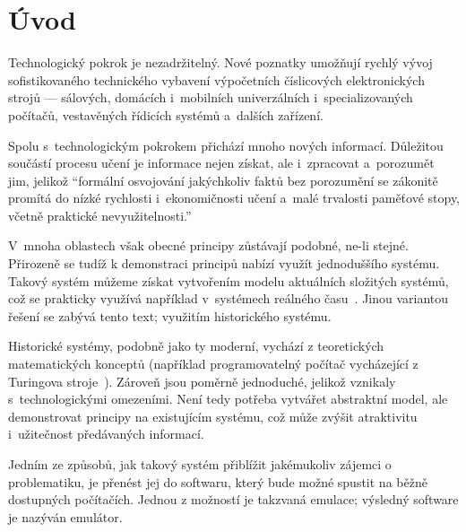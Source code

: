 \chapter*{Úvod}
\setcounter{page}{1}

Technologický pokrok je nezadržitelný. Nové poznatky umožňují rychlý vývoj sofistikovaného technického vybavení výpočetních číslicových elektronických strojů --- sálových, domácích i~mobilních univerzálních i~specializovaných počítačů, vestavěných řídicích systémů a~dalších zařízení.

Spolu s~technologickým pokrokem přichází mnoho nových informací. Důležitou součástí procesu učení je informace nejen získat, ale i~zpracovat a~porozumět jim, jelikož \enquote{formální osvojování jakýchkoliv faktů bez porozumění se zákonitě promítá do nízké rychlosti i~ekonomičnosti učení a~malé trvalosti paměťové stopy, včetně praktické nevyužitelnosti.}~\cite{Zacharova2012:psychologie}

V~mnoha oblastech však obecné principy zůstávají podobné, ne-li stejné. Přirozeně se tudíž k demonstraci principů nabízí využít jednoduššího systému. Takový systém můžeme získat vytvořením modelu aktuálních složitých systémů, což se prakticky využívá například v~systémech reálného času~\cite{Kubatova2019:src-modely}. Jinou variantou řešení se zabývá tento text; využitím historického systému.

Historické systémy, podobně jako ty moderní, vychází z teoretických matematických konceptů (například programovatelný počítač vycházející z Turingova stroje~\cite{Teuscher2003:turing}). Zároveň jsou poměrně jednoduché, jelikož vznikaly s~technologickými omezeními. Není tedy potřeba vytvářet abstraktní model, ale demonstrovat principy na existujícím systému, což může zvýšit atraktivitu i~užitečnost předávaných informací.

Jedním ze způsobů, jak takový systém přiblížit jakémukoliv zájemci o problematiku, je přenést jej do softwaru, který bude možné spustit na běžně dostupných počítačích. Jednou z možností je takzvaná emulace; výsledný software je nazýván emulátor.

